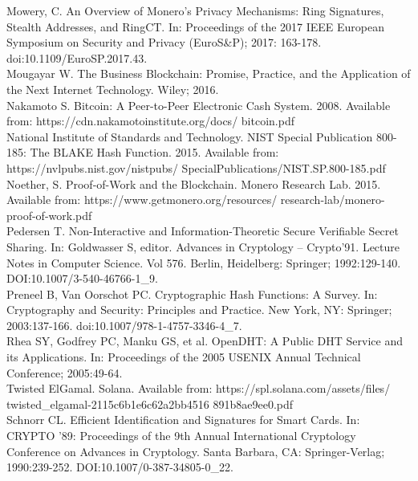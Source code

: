 \documentclass[10pt,a4paper,twocolumn]{article}
\begin{document}
Mowery, C. An Overview of Monero's Privacy Mechanisms: Ring Signatures, Stealth Addresses, and RingCT. In: Proceedings of the 2017 IEEE European Symposium on Security and Privacy (EuroS\&P); 2017: 163-178. doi:10.1109/EuroSP.2017.43.\\

Mougayar W. The Business Blockchain: Promise, Practice, and the Application of the Next Internet Technology. Wiley; 2016.\\

Nakamoto S. Bitcoin: A Peer-to-Peer Electronic Cash System. 2008. Available from: https://cdn.nakamotoinstitute.org/docs/ bitcoin.pdf \\

National Institute of Standards and Technology. NIST Special Publication 800-185: The BLAKE Hash Function. 2015. Available from: https://nvlpubs.nist.gov/nistpubs/ SpecialPublications/NIST.SP.800-185.pdf \\

Noether, S. Proof-of-Work and the Blockchain. Monero Research Lab. 2015. Available from: https://www.getmonero.org/resources/
research-lab/monero-proof-of-work.pdf \\

Pedersen T. Non-Interactive and Information-Theoretic Secure Verifiable Secret Sharing. In: Goldwasser S, editor. Advances in Cryptology – Crypto’91. Lecture Notes in Computer Science. Vol 576. Berlin, Heidelberg: Springer; 1992:129-140. DOI:10.1007/3-540-46766-1\_9.\\

Preneel B, Van Oorschot PC. Cryptographic Hash Functions: A Survey. In: Cryptography and Security: Principles and Practice. New York, NY: Springer; 2003:137-166. doi:10.1007/978-1-4757-3346-4\_7.\\

Rhea SY, Godfrey PC, Manku GS, et al. OpenDHT: A Public DHT Service and its Applications. In: Proceedings of the 2005 USENIX Annual Technical Conference; 2005:49-64.\\

Twisted ElGamal. Solana. Available from: https://spl.solana.com/assets/files/ twisted\_elgamal-2115c6b1e6c62a2bb4516 891b8ae9ee0.pdf\\

Schnorr CL. Efficient Identification and Signatures for Smart Cards. In: CRYPTO '89: Proceedings of the 9th Annual International Cryptology Conference on Advances in Cryptology. Santa Barbara, CA: Springer-Verlag; 1990:239-252. DOI:10.1007/0-387-34805-0\_22.\\
\end{document}
